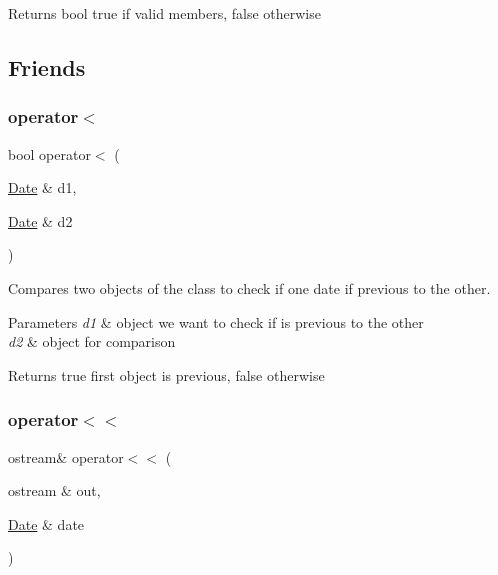\begin{DoxyReturn}{Returns}
bool true if valid members, false otherwise 
\end{DoxyReturn}


\subsection{Friends}
\mbox{\label{group___date_ga532ae38442ee586783b532725767634a}} 
\subsubsection{\texorpdfstring{operator$<$}{operator<}}
{\footnotesize\ttfamily bool operator$<$ (\begin{DoxyParamCaption}\item[{\hyperlink{class_date}{Date} \&}]{d1,  }\item[{\hyperlink{class_date}{Date} \&}]{d2 }\end{DoxyParamCaption})\hspace{0.3cm}{\ttfamily [friend]}}



Compares two objects of the class to check if one date if previous to the other. 


\begin{DoxyParams}{Parameters}
{\em d1} & object we want to check if is previous to the other \\
\hline
{\em d2} & object for comparison\\
\hline
\end{DoxyParams}
\begin{DoxyReturn}{Returns}
true first object is previous, false otherwise 
\end{DoxyReturn}
\mbox{\label{group___date_ga277b4ff7a5bea855f71b2b7f941fbc2f}} 
\subsubsection{\texorpdfstring{operator$<$$<$}{operator<<}}
{\footnotesize\ttfamily ostream\& operator$<$$<$ (\begin{DoxyParamCaption}\item[{ostream \&}]{out,  }\item[{\hyperlink{class_date}{Date} \&}]{date }\end{DoxyParamCaption})\hspace{0.3cm}{\ttfamily [friend]}}



